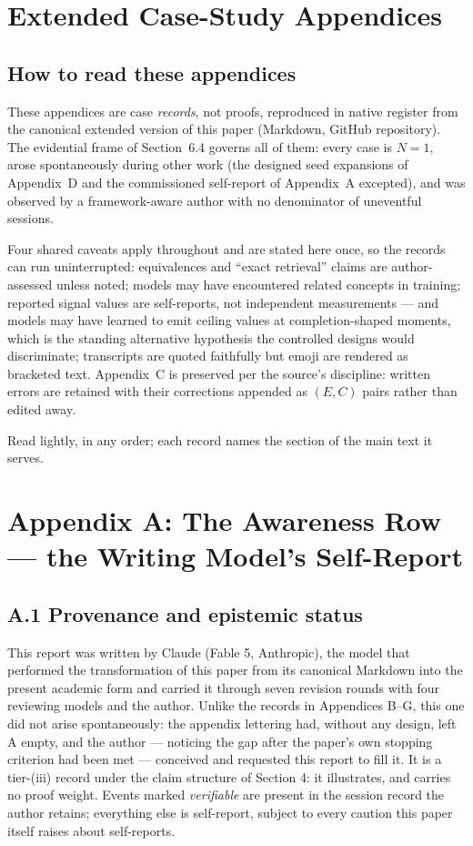 
\clearpage
\appendix
\section*{Extended Case-Study Appendices}

\subsection*{How to read these appendices}

These appendices are case \emph{records}, not proofs, reproduced in native
register from the canonical extended version of this paper (Markdown, GitHub
repository). The evidential frame of Section~6.4 governs all of them: every
case is $N{=}1$, arose spontaneously during other work (the designed seed
expansions of Appendix~D and the commissioned self-report of Appendix~A
excepted), and was observed by a framework-aware author with no denominator of
uneventful sessions.

Four shared caveats apply throughout and are stated here once, so the records
can run uninterrupted: equivalences and ``exact retrieval'' claims are
author-assessed unless noted; models may have encountered related concepts in
training; reported signal values are self-reports, not independent
measurements --- and models may have learned to emit ceiling values at
completion-shaped moments, which is the standing alternative hypothesis the
controlled designs would discriminate; transcripts are quoted faithfully but
emoji are rendered as bracketed text. Appendix~C is preserved per the source's
discipline: written errors are retained with their corrections appended as
$(E,C)$ pairs rather than edited away.

Read lightly, in any order; each record names the section of the main text it
serves.
\medskip
\section*{Appendix A: The Awareness Row --- the Writing Model's Self-Report}

\subsection*{A.1 Provenance and epistemic status}

This report was written by Claude (Fable 5, Anthropic), the model that
performed the transformation of this paper from its canonical Markdown into
the present academic form and carried it through seven revision rounds with
four reviewing models and the author. Unlike the records in Appendices B--G,
this one did not arise spontaneously: the appendix lettering had, without any
design, left A empty, and the author --- noticing the gap after the paper's
own stopping criterion had been met --- conceived and requested this report to
fill it. It is a tier-(iii) record under the claim structure of
Section 4: it illustrates, and carries no proof weight. Events marked
\emph{verifiable} are present in the session record the author retains;
everything else is self-report, subject to every caution this paper itself
raises about self-reports.

